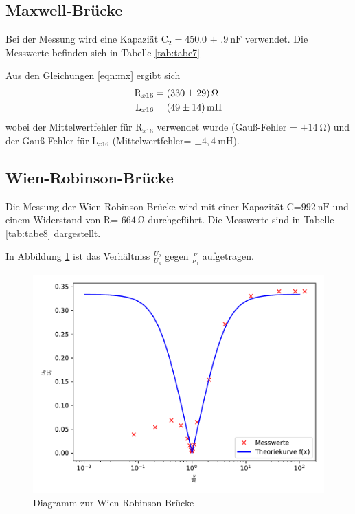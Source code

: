 \subsection{Maxwell-Brücke}

Bei der Messung wird eine Kapaziät $ \text{C}_{2} = \SI{450.0(9)}{\nano\farad} $
verwendet. Die Messwerte befinden sich in Tabelle \ref{tab:tabe7}

\noindent Aus den Gleichungen \ref{eqn:mx}
ergibt sich\begin{align*}
  \text{R}_{x16} &= \SI{330 (29)}{\ohm} \\
  \text{L}_{x16} &= \SI{49 (14)}{\milli\henry}
\end{align*}
\noindent wobei der Mittelwertfehler für $ \text{R}_{x16} $ verwendet wurde (Gauß-Fehler =
$ \pm 14 \: \si{\ohm} $) und der Gauß-Fehler für $ \text{L}_{x16} $ (Mittelwertfehler=
$ \pm 4,4 \: \si{\milli\henry} $).

\subsection{Wien-Robinson-Brücke}
Die Messung der Wien-Robinson-Brücke wird mit einer Kapazität C=$ 992 \: \si{\nano\farad}$
und einem Widerstand von R= $664\: \si{\ohm}$ durchgeführt. Die Messwerte sind in Tabelle
\ref{tab:tabe8} dargestellt.



\noindent In Abbildung \ref{fig:plot} ist das Verhältniss $\frac{U_b}{U_s}$ gegen
$\frac{\nu}{\nu_0} $ aufgetragen.

\begin{figure}[H]
  \centering
  \includegraphics{plot.pdf}
  \caption{Diagramm zur Wien-Robinson-Brücke}
  \label{fig:plot}
\end{figure}


